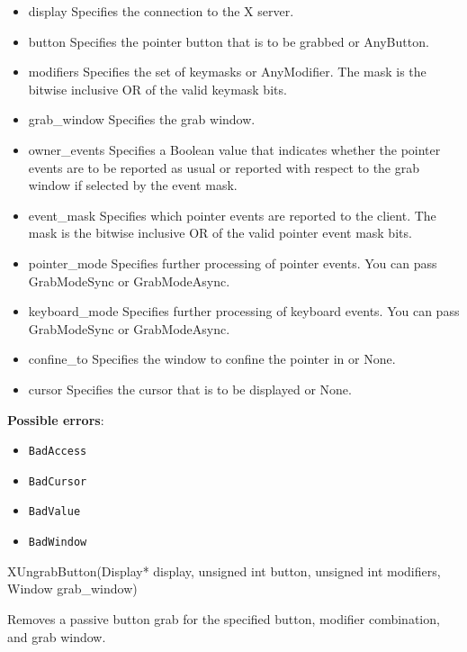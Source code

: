 \documentclass{report}
\begin{document}
\begin{itemize}
        \begin{itemize}
            \item display Specifies the connection to the X server.
            \item button Specifies the pointer button that is to be grabbed or AnyButton.
            \item modifiers Specifies the set of keymasks or AnyModifier. The mask is the bitwise inclusive OR of the valid keymask bits.
            \item grab\_window Specifies the grab window.
            \item owner\_events Specifies a Boolean value that indicates whether the pointer events are to be reported as usual or reported with respect to the grab window if selected by the event mask.
            \item event\_mask Specifies which pointer events are reported to the client. The mask is the bitwise inclusive OR of the valid pointer event mask bits.
            \item pointer\_mode Specifies further processing of pointer events. You can pass GrabModeSync or GrabModeAsync.
            \item keyboard\_mode Specifies further processing of keyboard events. You can pass GrabModeSync or GrabModeAsync.
            \item confine\_to Specifies the window to confine the pointer in or None.
            \item cursor Specifies the cursor that is to be displayed or None.
        \end{itemize}

        \textbf{Possible errors}:
        \begin{itemize}
            \item \texttt{BadAccess}
            \item \texttt{BadCursor}
            \item \texttt{BadValue}
            \item \texttt{BadWindow}
        \end{itemize}

        \begin{cppcode}
        XUngrabButton(Display* display, unsigned int button, unsigned int modifiers, Window grab_window)
        \end{cppcode}
        \bigbreak \noindent
        Removes a passive button grab for the specified button, modifier combination, and grab window.


\end{itemize}
\end{document}
